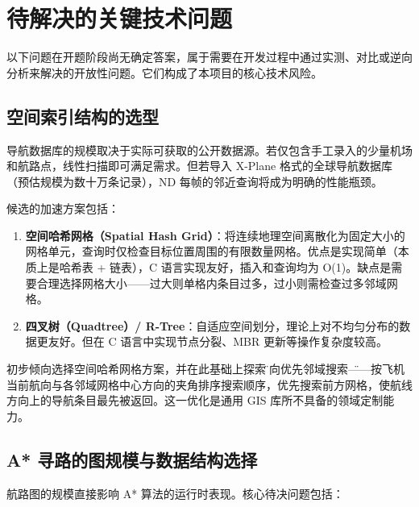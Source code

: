 \documentclass[12pt,a4paper]{ctexart}
\begin{document}
\section{待解决的关键技术问题}


以下问题在开题阶段尚无确定答案，属于需要在开发过程中通过实测、对比或逆向分析来解决的开放性问题。它们构成了本项目的核心技术风险。

\subsection{空间索引结构的选型}

导航数据库的规模取决于实际可获取的公开数据源。若仅包含手工录入的少量机场和航路点，线性扫描即可满足需求。但若导入 X-Plane 格式的全球导航数据库（预估规模为数十万条记录），ND 每帧的邻近查询将成为明确的性能瓶颈。

候选的加速方案包括：

\begin{enumerate}[leftmargin=*]
    \item \textbf{空间哈希网格（Spatial Hash Grid）}：将连续地理空间离散化为固定大小的网格单元，查询时仅检查目标位置周围的有限数量网格。优点是实现简单（本质上是哈希表 + 链表），C 语言实现友好，插入和查询均为 O(1)。缺点是需要合理选择网格大小——过大则单格内条目过多，过小则需检查过多邻域网格。
    \item \textbf{四叉树（Quadtree）/ R-Tree}：自适应空间划分，理论上对不均匀分布的数据更友好。但在 C 语言中实现节点分裂、MBR 更新等操作复杂度较高。
\end{enumerate}

初步倾向选择空间哈希网格方案，并在此基础上探索\"航向优先邻域搜索\"——按飞机当前航向与各邻域网格中心方向的夹角排序搜索顺序，优先搜索前方网格，使航线方向上的导航条目最先被返回。这一优化是通用 GIS 库所不具备的领域定制能力。

\subsection{A* 寻路的图规模与数据结构选择}

航路图的规模直接影响 A* 算法的运行时表现。核心待决问题包括：
\end{document}
